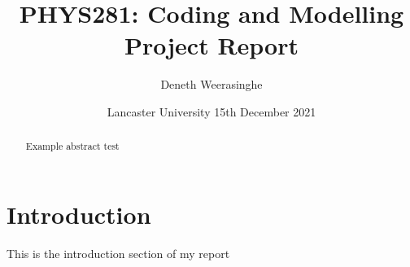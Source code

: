 \documentclass[11pt]{article}
\begin{document}
    \title{PHYS281: Coding and Modelling Project Report}
    \author{Deneth Weerasinghe}
    \date{Lancaster University
    15th December 2021
    }
    \maketitle
    
        \begin{abstract}
Example abstract test
        \end{abstract}
    \tableofcontents
    \section{Introduction}\label{sec:intro}
This is the introduction section of my report
\end{document}
